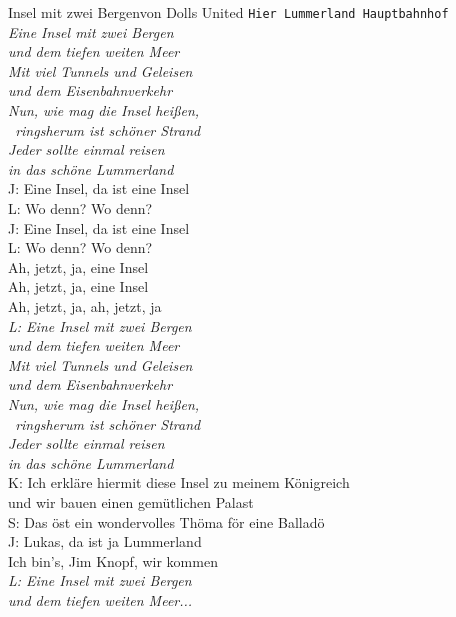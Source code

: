 
\begin{lied*}{Insel mit zwei Bergen}{von Dolls United}
\texttt{Hier Lummerland Hauptbahnhof}\\

\textit{Eine Insel mit zwei Bergen\\
und dem tiefen weiten Meer\\
Mit viel Tunnels und Geleisen\\
und dem Eisenbahnverkehr\\
Nun, wie mag die Insel heißen,\\\
ringsherum ist schöner Strand\\
Jeder sollte einmal reisen\\
in das schöne Lummerland}\\

J: Eine Insel, da ist eine Insel\\
L: Wo denn? Wo denn?\\
J: Eine Insel, da ist eine Insel\\
L: Wo denn? Wo denn?\\
Ah, jetzt, ja, eine Insel\\
Ah, jetzt, ja, eine Insel\\
Ah, jetzt, ja, ah, jetzt, ja\\

\textit{L: Eine Insel mit zwei Bergen\\
und dem tiefen weiten Meer\\
Mit viel Tunnels und Geleisen\\
und dem Eisenbahnverkehr\\
Nun, wie mag die Insel heißen,\\\
ringsherum ist schöner Strand\\
Jeder sollte einmal reisen\\
in das schöne Lummerland}\\

K: Ich erkläre hiermit diese Insel zu meinem Königreich\\
und wir bauen einen gemütlichen Palast\\
S: Das öst ein wondervolles Thöma för eine Balladö\\
J: Lukas, da ist ja Lummerland\\
Ich bin’s, Jim Knopf, wir kommen\\

\textit{L: Eine Insel mit zwei Bergen\\
und dem tiefen weiten Meer...}\\


\end{lied*}
